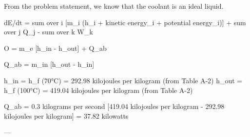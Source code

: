 From the problem statement, we know that the coolant is an ideal liquid.  

dE/dt = sum over i [m_i (h_i + kinetic energy_i + potential energy_i)] + sum over j Q_j - sum over k W_k  

O = m_e [h_in - h_out] + Q_ab  

Q_ab = m_in [h_out - h_in]  

h_in = h_f (70°C) = 292.98 kilojoules per kilogram (from Table A-2)  
h_out = h_f (100°C) = 419.04 kilojoules per kilogram (from Table A-2)  

Q_ab = 0.3 kilograms per second [419.04 kilojoules per kilogram - 292.98 kilojoules per kilogram] = 37.82 kilowatts  

---